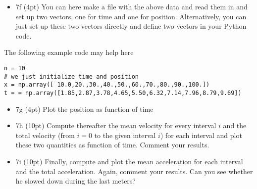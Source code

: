 \documentclass[%
oneside,                 %
final,                   %
10pt]{article}
\begin{document}
\noindent
\begin{itemize}
\item 7f (4pt) You can here make a file with the above data and read them in and set up two vectors, one for time and one for position. Alternatively, you can just set up these two vectors directly and define two vectors in your Python code.
\end{itemize}

\noindent
The following example code may help here
\begin{verbatim}
n = 10
# we just initialize time and position
x = np.array([ 10.0,20.,30.,40.,50.,60.,70.,80.,90.,100.])
t = = np.array([1.85,2.87,3.78,4.65,5.50,6.32,7.14,7.96,8.79,9.69])
\end{verbatim}

\begin{itemize}
\item 7g (4pt) Plot the position as function of time

\item 7h (10pt) Compute thereafter the mean velocity for every interval $i$ and the total velocity (from $i=0$ to the given interval $i$) for each interval and plot these two quantities as function of time. Comment your results.

\item 7i (10pt) Finally, compute and plot the mean acceleration for each interval and the total acceleration. Again, comment your results. Can you see whether he slowed down during the last meters? 
\end{itemize}

\noindent

\end{document}

